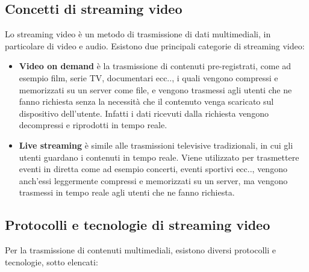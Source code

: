 \subsection{Concetti di streaming video}
Lo streaming video è un metodo di trasmissione di dati multimediali, in particolare di video e audio.
Esistono due principali categorie di streaming video:\\
\begin{itemize}
    \item \textbf{Video on demand} è la trasmissione di contenuti pre-registrati, come ad esempio film, serie TV, documentari ecc.., i quali vengono compressi e memorizzati su un server come file,
    e vengono trasmessi agli utenti che ne fanno richiesta senza la necessità che il contenuto venga scaricato sul dispositivo dell'utente. Infatti i dati ricevuti dalla richiesta vengono decompressi e riprodotti in tempo reale.
    \item \textbf{Live streaming} è simile alle trasmissioni televisive tradizionali, in cui gli utenti guardano i contenuti in tempo reale. Viene utilizzato per trasmettere eventi in 
    diretta come ad esempio concerti, eventi sportivi ecc.., vengono anch'essi leggermente compressi e memorizzati su un server, ma vengono trasmessi in tempo reale agli utenti che ne fanno richiesta.
    \end{itemize}
\subsection{Protocolli e tecnologie di streaming video}
Per la trasmissione di contenuti multimediali, esistono diversi protocolli e tecnologie, sotto elencati:

